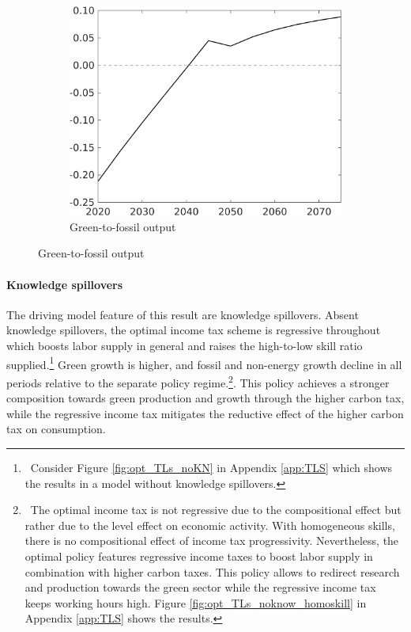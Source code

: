 \begin{figure}[h!!!]
\begin{subfigure}{0.4\textwidth}
\end{subfigure}
\begin{subfigure}{0.4\textwidth}
\caption{Green-to-fossil output}
\includegraphics[width=1\textwidth]{../../codding_model/own_basedOnFried/optimalPol_010922_revision/figures/all_13Sept22_Tplus30/GFF_OPT_COMPtaulPer_regime4_spillover0_knspil0_noskill0_sep0_xgrowth0_PV1_etaa0.79.png}
\end{subfigure}
\end{figure} 

\paragraph{Knowledge spillovers}
The driving model feature of this result are knowledge spillovers. Absent knowledge spillovers, the optimal income tax scheme is regressive throughout which boosts labor supply in general and raises the high-to-low skill ratio supplied.\footnote{\ Consider Figure \ref{fig:opt_TLs_noKN} in Appendix \ref{app:TLS} which shows the results in a model without knowledge spillovers.} Green growth is higher, and fossil and non-energy growth decline in all periods relative to the separate policy regime.\footnote{\  The optimal income tax is not regressive due to the compositional effect but rather due to the level effect on economic activity. With homogeneous skills, there is no compositional effect of income tax progressivity. Nevertheless, the optimal policy features regressive income taxes to boost labor supply in combination with higher carbon taxes. This policy allows to redirect research and production towards the green sector while the regressive income tax keeps working hours high. Figure \ref{fig:opt_TLs_noknow_homoskill} in Appendix \ref{app:TLS} shows the results. 
}. This policy achieves a stronger composition towards green production and growth through the higher carbon tax, while the regressive income tax mitigates the reductive effect of the higher carbon tax on consumption. 


